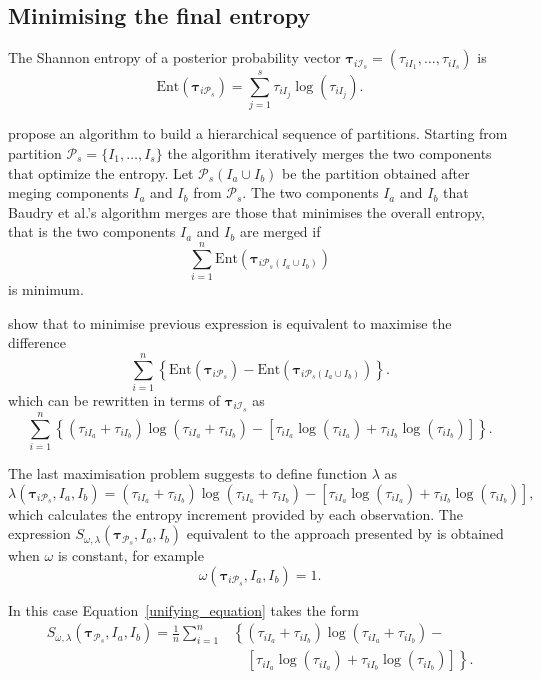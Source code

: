 \documentclass[submit]{smj}
\theoremstyle{definition}
\newcommand{\m}[1]{\boldsymbol{#1}}
\begin{document}
\subsection{Minimising the final entropy}
\label{entropy_section}

The Shannon entropy of a posterior probability vector $\m\tau_{i \mathcal{I}_s} = \left( \tau_{i I_1} , \dots, \tau_{i I_s}  \right)$ is
\[
\text{Ent}( \m\tau_{i \mathcal{P}_s} ) = \sum_{j=1}^s \tau_{i I_j}  \log(\tau_{i I_j} ).
\]


\cite{baudry2010combining} propose an algorithm to build a hierarchical sequence of partitions. Starting from partition $\mathcal{P}_s = \{ I_1, \dots, I_s\}$ the algorithm iteratively merges  the two components that optimize the entropy. Let $\mathcal{P}_s(I_a\cup I_b)$ be the partition obtained after meging components $I_a$ and $I_b$ from $\mathcal{P}_s$. The two components $I_a$ and $I_b$ that Baudry et al.'s algorithm merges are those that minimises the overall entropy, that is the two components $I_a$ and $I_b$ are merged if
\[
\sum_{i=1}^n \text{Ent}( \m\tau_{i \mathcal{P}_s(I_a\cup I_b)} )
\]
is minimum.


\cite{baudry2010combining}  show that to minimise previous expression is equivalent to maximise the difference
\[
\sum_{i=1}^n  \left\{ \text{Ent}( \m\tau_{i \mathcal{P}_s} ) - \text{Ent}( \m\tau_{i \mathcal{P}_s(I_a\cup I_b)} ) \right\}.
\]
which can be rewritten in terms of $\m\tau_{i \mathcal{I}_s}$ as
\begin{equation}\label{entropy}
\sum_{i=1}^n   \left\{(\tau_{iI_a}+\tau_{iI_b}) \log(\tau_{iI_a} + \tau_{iI_b}) - \left[\tau_{iI_a} \log(\tau_{iI_a}) + \tau_{iI_b} \log(\tau_{iI_b})\right] \right\}.
\end{equation}


The last maximisation problem suggests to define function $\lambda$ as
\[
\lambda(\m\tau_{i \mathcal{P}_s},  I_a,  I_b) =  (\tau_{iI_a}+\tau_{iI_b}) \log(\tau_{iI_a} + \tau_{iI_b}) - \left[ \tau_{iI_a} \log(\tau_{iI_a}) + \tau_{iI_b} \log(\tau_{iI_b}) \right],
\]
which calculates the entropy increment provided by each observation. The expression $S_{\omega, \lambda}( \m\tau_{\mathcal{P}_s},  I_a,  I_b) $ equivalent to the approach presented by \cite{baudry2010combining} is obtained when $\omega$ is constant, for example 
\[
\omega(\m\tau_{i \mathcal{P}_s},  I_a,  I_b) = 1.
\]

In this case Equation~\ref{unifying_equation} takes the form
\[
\begin{split}
S_{\omega, \lambda}( \m\tau_{\mathcal{P}_s},  I_a,  I_b) = \frac{1}{n} \sum_{i=1}^n & \left\{(\tau_{iI_a}+\tau_{iI_b}) \log(\tau_{iI_a} + \tau_{iI_b}) - \right.\\ 
&\quad \left.\left[ \tau_{iI_a} \log(\tau_{iI_a}) + \tau_{iI_b} \log(\tau_{iI_b}) \right]\right\}.
\end{split}
\]
\end{document}
